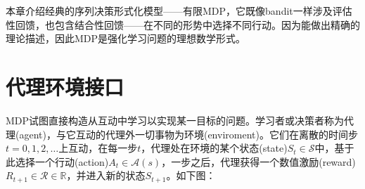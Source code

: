 \documentclass{ctexart}
\begin{document}
本章介绍经典的序列决策形式化模型——有限MDP，它既像bandit一样涉及评估性回馈，也包含结合性回馈——在不同的形势中选择不同行动。因为能做出精确的理论描述，因此MDP是强化学习问题的理想数学形式。

\section{代理环境接口}

MDP试图直接构造从互动中学习以实现某一目标的问题。学习者或决策者称为代理(agent)，与它互动的代理外一切事物为环境(enviroment)。它们在离散的时间步$t=0,1,2,\dots$上互动，在每一步$t$，代理处在环境的某个状态(state)$S_t \in \mathcal S$中，基于此选择一个行动(action)$A_t \in \mathcal A(s)$，一步之后，代理获得一个数值激励(reward)$R_{t+1} \in \mathcal R \in \mathbb R$，并进入新的状态$S_{t+1}$。如下图：
\end{document}
